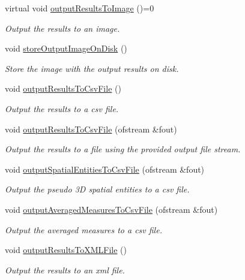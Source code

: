 \begin{DoxyCompactItemize}
virtual void \hyperlink{classmultiscale_1_1analysis_1_1Detector_a5d10b68605d5a1711527b4b896b3b2cc}{output\-Results\-To\-Image} ()=0
\begin{DoxyCompactList}\small\item\em Output the results to an image. \end{DoxyCompactList}\item 
void \hyperlink{classmultiscale_1_1analysis_1_1Detector_aa15a7546c4f8f77fcf85632386a4c5d5}{store\-Output\-Image\-On\-Disk} ()
\begin{DoxyCompactList}\small\item\em Store the image with the output results on disk. \end{DoxyCompactList}\item 
void \hyperlink{classmultiscale_1_1analysis_1_1Detector_a2055dc183dd3601d9979bc99a3222eb4}{output\-Results\-To\-Csv\-File} ()
\begin{DoxyCompactList}\small\item\em Output the results to a csv file. \end{DoxyCompactList}\item 
void \hyperlink{classmultiscale_1_1analysis_1_1Detector_a8f77ceb1535be09ef149aedcd6b1a84e}{output\-Results\-To\-Csv\-File} (ofstream \&fout)
\begin{DoxyCompactList}\small\item\em Output the results to a file using the provided output file stream. \end{DoxyCompactList}\item 
void \hyperlink{classmultiscale_1_1analysis_1_1Detector_a64d541cd53a16dc5f204413820c6b0ef}{output\-Spatial\-Entities\-To\-Csv\-File} (ofstream \&fout)
\begin{DoxyCompactList}\small\item\em Output the pseudo 3\-D spatial entities to a csv file. \end{DoxyCompactList}\item 
void \hyperlink{classmultiscale_1_1analysis_1_1Detector_a3f4f3192d392f26e324ef9760820d904}{output\-Averaged\-Measures\-To\-Csv\-File} (ofstream \&fout)
\begin{DoxyCompactList}\small\item\em Output the averaged measures to a csv file. \end{DoxyCompactList}\item 
void \hyperlink{classmultiscale_1_1analysis_1_1Detector_a574c1c58c9e0bab3d224e5b0a77e410a}{output\-Results\-To\-X\-M\-L\-File} ()
\begin{DoxyCompactList}\small\item\em Output the results to an xml file. \end{DoxyCompactList}\item 

\end{DoxyCompactItemize}
